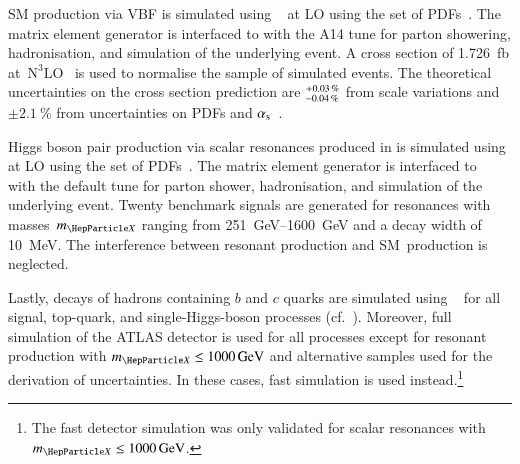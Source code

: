 SM \HH production via VBF is simulated using
\MGNLO~\cite{Alwall:2014hca} %
at LO %
using the \NNPDF[3.0nlo] set of PDFs~\cite{Ball:2014uwa}. The matrix element
generator is interfaced to \PYTHIA[8] with the A14 tune for parton showering,
hadronisation, and simulation of the underlying event. A cross section of
\SI{1.726}{\femto\barn} at~$\text{N}^3\text{LO}$~\cite{Dreyer:2018qbw,LHCHWGHH}
is used to normalise the sample of simulated events. The theoretical
uncertainties on the cross section prediction are
$^{\hspace{0.25pt}+\hspace{0.25pt}0.03\,\%}_{-0.04\,\%}$ from scale variations
and $\pm\SI{2.1}{\percent}$ from uncertainties on PDFs and
$\alpha_{\text{s}}$~\cite{LHCHWGHH}.

Higgs boson pair production via scalar resonances produced in \ggF is simulated
using \MGNLO at LO using the \NNPDF[2.3lo] set of PDFs~\cite{Ball:2012cx}. The
matrix element generator is interfaced to
\HERWIG[7.1]~\cite{Gieseke:2012ft,Bellm:2017jjp} with the default tune for
parton shower, hadronisation, and simulation of the underlying event. Twenty
benchmark signals are generated for resonances with masses~$\mX$ ranging from
\SIrange{251}{1600}{\GeV} and a decay width of \SI{10}{\MeV}.
The interference between resonant \HH production and SM~\HH production is
neglected.

Lastly, decays of hadrons containing $b$ and $c$ quarks are simulated using
\EVTGEN~\cite{Lange:2001uf} for all signal, top-quark, and single-Higgs-boson
processes (cf.~). Moreover, full simulation of the ATLAS
detector is used for all processes except for resonant \HH production with
$\mX \leq \SI{1000}{\GeV}$ and alternative samples used for the derivation of
uncertainties. In these cases, fast simulation is used instead.\footnote{The
  fast detector simulation was only validated for scalar resonances with
  $\mX \leq \SI{1000}{\GeV}$.}

